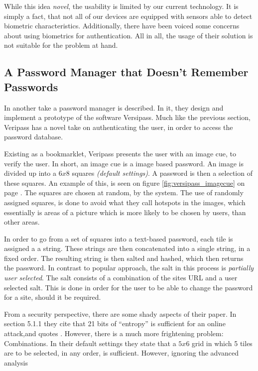 			While this idea \emph{novel}, the usability is limited by our current technology. It is simply a fact, that not all of our devices are equipped with sensors able to detect biometric characteristics. Additionally, there have been voiced some concerns about using biometrics for authentication. All in all, the usage of their solution is not suitable for the problem at hand.

		\subsection*{A Password Manager that Doesn’t Remember Passwords}
			In \cite{stobert2014} another take a password manager is described. In it, they design and implement a prototype of the software Versipass. Much like the previous section, Veripass has a novel take on authenticating the user, in order to access the password database.

			Existing as a bookmarklet, Veripass presents the user with an image cue, to verify the user. In short, an image cue is a image based password. An image is divided up into a $6x8$ squares \emph{(default settings)}. A password is then a selection of these squares. An example of this, is seen on figure \ref{fig:versipass_imagecue} on page \pageref{fig:versipass_imagecue}. The squares are chosen at random, by the system. The use of randomly assigned squares, is done to avoid what they call hotspots in the images, which essentially is areas of a picture which is more likely to be chosen by users, than other areas. 

			In order to go from a set of squares into a text-based password, each tile is assigned a a string. These strings are then concatenated into a single string, in a fixed order. The resulting string is then salted and hashed, which then returns the password. In contrast to popular approach, the salt in this process is \emph{ partially user selected}. The salt consists of a combination of the sites URL and a user selected salt. This is done in order for the user to be able to change the password for a site, should it be required.

			From a security perspective, there are some shady aspects of their paper. In section 5.1.1 they cite that 21 bits of ``entropy'' is sufficient for an online attack,and quotes \cite{florencio2014}. However, there is a much more frightening problem: Combinations. In their default settings they state that a $5x6$ grid in which 5 tiles are to be selected, in any order, is sufficient. However, ignoring the advanced analysis


